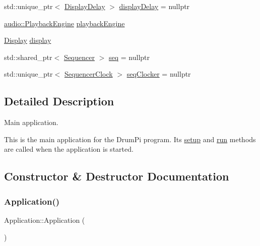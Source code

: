 \begin{DoxyCompactItemize}
\item 
std\+::unique\+\_\+ptr$<$ \hyperlink{classdrumpi_1_1DisplayDelay}{Display\+Delay} $>$ \hyperlink{classdrumpi_1_1Application_a86917e6bfed1be47bde5ea4929670d4b}{display\+Delay} = nullptr
\item 
\hyperlink{classdrumpi_1_1audio_1_1PlaybackEngine}{audio\+::\+Playback\+Engine} \hyperlink{classdrumpi_1_1Application_a813412b90daccbf979d7659224e0abee}{playback\+Engine}
\item 
\hyperlink{classdrumpi_1_1Display}{Display} \hyperlink{classdrumpi_1_1Application_ad318b1bdecc292bbbf3a91cf832dd97a}{display}
\item 
std\+::shared\+\_\+ptr$<$ \hyperlink{classdrumpi_1_1Sequencer}{Sequencer} $>$ \hyperlink{classdrumpi_1_1Application_ad795ecd7508c554e1f50183505ee052d}{seq} = nullptr
\item 
std\+::unique\+\_\+ptr$<$ \hyperlink{classdrumpi_1_1SequencerClock}{Sequencer\+Clock} $>$ \hyperlink{classdrumpi_1_1Application_a62b1dda72ffccc481b62a0c5b2ae9b84}{seq\+Clocker} = nullptr
\end{DoxyCompactItemize}


\subsection{Detailed Description}
Main application. 

This is the main application for the Drum\+Pi program. Its \hyperlink{classdrumpi_1_1Application_a31dd3f7f8fba9fc2fd32ceaff6ce36e7}{setup} and \hyperlink{classdrumpi_1_1Application_a68965449404743bf1add056784d6cf81}{run} methods are called when the application is started. 

\subsection{Constructor \& Destructor Documentation}
\mbox{\label{classdrumpi_1_1Application_afa8cc05ce6b6092be5ecdfdae44e05f8}} 
\subsubsection{\texorpdfstring{Application()}{Application()}}
{\footnotesize\ttfamily Application\+::\+Application (\begin{DoxyParamCaption}{ }\end{DoxyParamCaption})}


